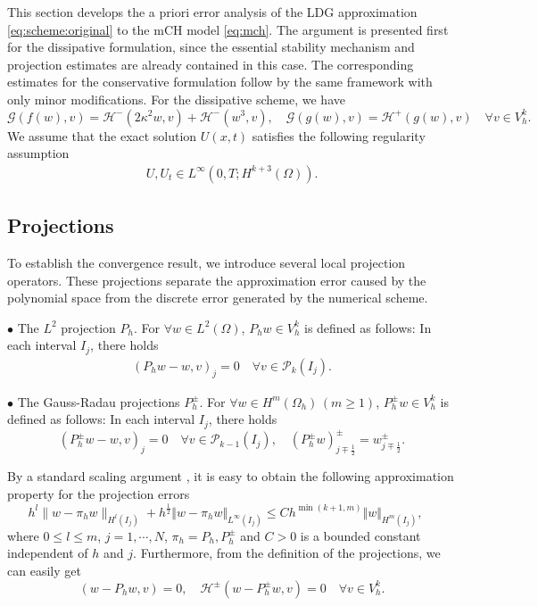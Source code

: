 \documentclass[11pt]{article}
\newcommand{\Ht}{H^{m}(\Omega_h)}
\newcommand{\norm}   [1] {\Vert#1\Vert}
\newcommand{\Hcal} {\mathcal{H}}
\newcommand{\Gcal} {\mathcal{G}}
\numberwithin{equation}{section}
\begin{document}
This section develops the a priori error analysis of the LDG approximation \eqref{eq:scheme:original} to the
mCH model \eqref{eq:mch}. The argument is presented first for the dissipative formulation, since the
essential stability mechanism and projection estimates are already contained in this case.
The corresponding estimates for the conservative formulation follow by the same framework
with only minor modifications. For the dissipative scheme, we have
$$\Gcal(f(w), v)=\Hcal^-(2\kappa^2 w, v)+\Hcal^-(w^3, v),\quad \Gcal(g(w), v)=\Hcal^+(g(w), v) \quad \forall v\in V_h^k.$$
We assume that the exact solution $U(x,t)$ satisfies the following regularity assumption
\begin{align}\label{smooth:assumption}
	{U, U_t \in L^{\infty}(0,T;H^{k+3}(\Omega)).}
\end{align}
\subsection{Projections}
To establish the convergence result, we introduce several local projection operators. These
projections separate the approximation error caused by the polynomial space from the
discrete error generated by the numerical scheme.

$\bullet$ The $L^2$ projection $P_h$.  For $\forall w\in L^2(\Omega)$, $P_hw\in V_h^k$ is defined as follows: In each interval $I_j$, there holds
\begin{align*}
	 (P_hw-w, v)_{j}=0\quad \forall v\in \mathcal{P}_{k}(I_j).
\end{align*}

$\bullet$ The Gauss-Radau projections $P_h^{\pm}$. For $\forall w\in \Ht\, (m\geq1)$, $P_h^{\pm}w\in V_h^k$ is defined as follows: In each interval $I_j$, there holds
\begin{equation*}
       (P_h^{\pm}w-w, v)_{j}=0 \quad \forall v\in \mathcal{P}_{k-1}(I_j),\quad
       (P_h^{\pm}w)_{j\mp\frac12}^{\pm}=w_{j\mp\frac12}^{\pm}.
\end{equation*}

By a standard scaling argument \cite{Ciarlet1978}, it is easy to obtain
the following approximation property for the projection errors
\begin{equation} \label{estimate:eta}
	h^{l}\|w-\pi_h w\|_{H^{l}(I_j)} +h^{\frac12} \norm{w-\pi_h w}_{L^\infty(I_j)} \leq
	C h^{\min(k+1,m)} \norm{w}_{H^m(I_j)}, \quad
\end{equation}
where $0\leq l\leq m$, $j=1,\cdots, N$, $\pi_h=P_h, P_h^\pm$ and $C>0$ is a bounded constant independent of $h$ and $j$.
Furthermore, from the definition of the projections, we can easily get
\begin{equation}\label{property:projection}
(w-P_hw, v)=0,\quad \Hcal^\pm(w-P_h^\pm w,v)=0 \quad \forall v\in V_h^k.
\end{equation}
\end{document}
